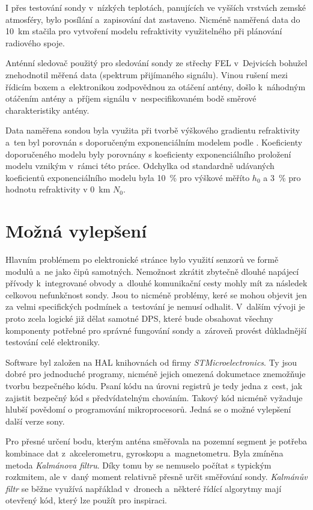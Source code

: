 \documentclass[twoside]{ctuthesis}
\newcommand{\mt}[1]{\text{#1}}
\theoremstyle{plain}
\theoremstyle{definition}
\theoremstyle{note}
\begin{document}
	I přes testování sondy v~nízkých teplotách, panujících ve vyšších vrstvách zemské atmosféry, bylo posílání a~zapisování dat zastaveno. Nicméně naměřená data do 10~km stačila pro vytvoření modelu refraktivity využitelného při plánování radiového spoje.

	Anténní sledovač použitý pro sledování sondy ze střechy FEL v~Dejvicích bohužel znehodnotil měřená data (spektrum přijímaného signálu). Vinou rušení mezi řídicím boxem a~elektronikou zodpovědnou za otáčení antény, došlo k~náhodným otáčením antény a~příjem signálu v~nespecifikovaném bodě směrové charakteristiky antény. 

	Data naměřena sondou byla využita při tvorbě výškového gradientu refraktivity a~ten byl porovnán s doporučeným exponenciálním modelem podle \cite{ITU:refrac}. Koeficienty doporučeného modelu byly porovnány s koeficienty exponenciálního proložení modelu vznikým v~rámci této práce. Odchylka od standardně udávaných koeficientů exponenciálního modelu byla 10~\% pro výškové měříto $h_\text{0}$ a 3~\% pro hodnotu refraktivity v 0~km $N_\mt{0}$. 



	\section{Možná vylepšení}
	Hlavním problémem po elektronické stránce bylo využití senzorů ve formě modulů a~ne jako čipů samotných. Nemožnost zkrátit zbytečně dlouhé napájecí přívody k~integrované obvody a~dlouhé komunikační cesty mohly mít za následek celkovou nefunkčnost sondy. Jsou to nicméně problémy, keré se mohou objevit jen za velmi specifických podmínek a~testování je nemusí odhalit. V~dalším vývoji je proto zcela logické již dělat samotné DPS, které bude obsahovat všechny komponenty potřebné pro správné fungování sondy a~zároveň provést důkladnější testování celé elektroniky.

	Software byl založen na HAL knihovnách od firmy \textit{STMicroelectronics}. Ty jsou dobré pro jednoduché programy, nicméně jejich omezená dokumetace znemožňuje tvorbu bezpečného kódu. Psaní kódu na úrovni registrů je tedy jedna z~cest, jak zajistit bezpečný kód s předvídatelným chováním. Takový kód nicméně vyžaduje hlubší povědomí o programování mikroprocesorů. Jedná se o možné vylepšení další verze sony.

	Pro přesné určení bodu, kterým anténa směřovala na pozemní segment je potřeba kombinace dat z~akcelerometru, gyroskopu a~magnetometru. Byla zmíněna metoda \textit{Kalmánova filtru}. Díky tomu by se nemuselo počítat s typickým rozkmitem, ale v~daný moment relativně přesně určit směřování sondy. \textit{Kalmánův filtr} se běžne využívá napřáklad v~dronech a~některé řídící algorytmy mají otevřený kód, který lze použít pro inspiraci.
\end{document}
